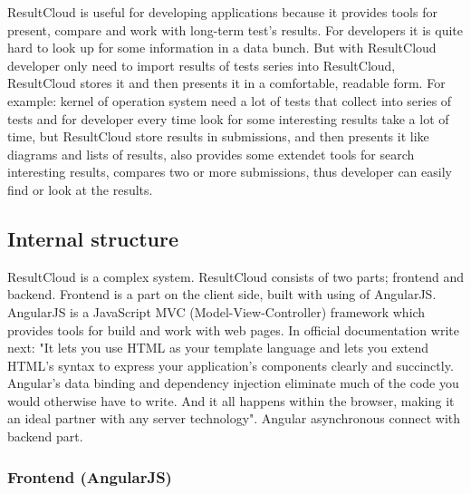 ResultCloud is useful for developing applications because it provides tools for present, compare and work with long-term test's results. For developers it is quite hard to look up for some information in a data bunch. But with ResultCloud developer only need to import results of tests series into ResultCloud, ResultCloud stores it and then presents it in a comfortable, readable form. For example: kernel of operation system need a lot of tests that collect into series of tests and for developer every time look for some interesting results take a lot of time, but ResultCloud store results in submissions, and then presents it like diagrams and lists of results, also provides some extendet tools for search interesting results, compares two or more submissions, thus developer can easily find or look at the results.

\subsection{Internal structure}

ResultCloud is a complex system. ResultCloud consists of two parts; frontend and backend. Frontend is a part on the client side, built with using of AngularJS. AngularJS is a JavaScript MVC (Model-View-Controller) framework which provides tools for build and work with web pages. In official documentation write next: "It lets you use HTML as your template language and lets you extend HTML's syntax to express your application's components clearly and succinctly. Angular's data binding and dependency injection eliminate much of the code you would otherwise have to write. And it all happens within the browser, making it an ideal partner with any server technology"\cite{angularJS}. Angular asynchronous connect with backend part. 

\subsubsection{Frontend (AngularJS)}

